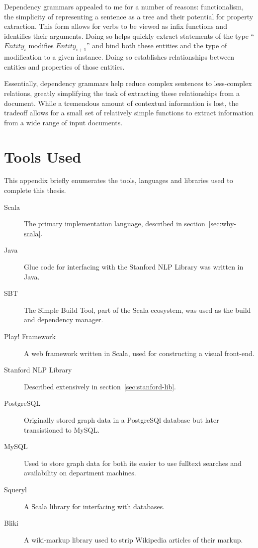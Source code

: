 Dependency grammars appealed to me for a number of reasons: functionalism, the simplicity of representing a sentence as a tree and their potential for property extraction.  This form allows for verbs to be viewed as infix functions and identifies their arguments.  Doing so helps quickly extract statements of the type ``$Entity_{i}$ modifies $Entity_{i+1}$'' and bind both these entities and the type of modification to a given instance.  Doing so establishes relationships between entities and properties of those entities.  

Essentially, dependency grammars help reduce complex sentences to less-complex relations, greatly simplifying the task of extracting these relationships from a document.  While a tremendous amount of contextual information is lost, the tradeoff allows for a small set of relatively simple functions to extract information from a wide range of input documents.  




\chapter{Tools Used}

This appendix briefly enumerates the tools, languages and libraries used to complete this thesis.

\begin{description}
\item[Scala] The primary implementation language, described in section~\ref{sec:why-scala}.
\item[Java] Glue code for interfacing with the Stanford NLP Library was written in Java.
\item[SBT] The Simple Build Tool, part of the Scala ecosystem, was used as the build and dependency manager.
\item[Play! Framework] A web framework written in Scala, used for constructing a visual front-end.
\item[Stanford NLP Library] Described extensively in section~\ref{sec:stanford-lib}.
\item[PostgreSQL] Originally stored graph data in a PostgreSQl database but later transistioned to MySQL.
\item[MySQL] Used to store graph data for both its easier to use fulltext searches and availability on department machines.
\item[Squeryl] A Scala library for interfacing with databases.
\item[Bliki] A wiki-markup library used to strip Wikipedia articles of their markup.
\end{description}



\nocite{nlpdeps,nlpfparse,nlpparser}
